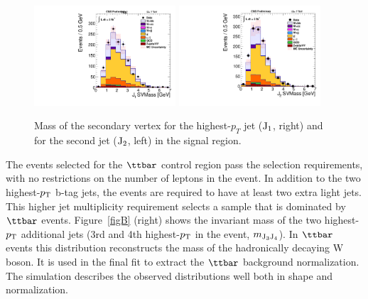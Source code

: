 \begin{figure}
\centering
\includegraphics[width=0.47\textwidth]{Wbb/fig1a_J1Mass.pdf}
\includegraphics[width=0.47\textwidth]{Wbb/fig1a_J2Mass.pdf}
\caption{Mass of the secondary vertex for the highest-$p_{T}$ jet ($\rm{J_{1}}$, right) and for the second jet ($\rm{J_{2}}$, left) in the signal region.}
\label{figAbis}
\end{figure}

The events selected for the $\ttbar$ control region pass the selection requirements, with
no restrictions on the number of leptons in the event. 
In addition to the two highest-$p_\mathrm{T}$ b-tag jets, the events are required to have at least two extra light jets.
This higher jet multiplicity requirement selects a sample that is dominated by $\ttbar$ events.
Figure~\ref{figB} (right) shows the invariant mass of the 
two highest-$p_\mathrm{T}$ additional jets (3rd and 4th highest-$p_\mathrm{T}$ in the event, $m_{\rm{J_{3}J_{4}}}$). 
In $\ttbar$ events this distribution reconstructs the mass of the hadronically decaying W boson. 
It is used in the final fit to extract the $\ttbar$ background normalization.
The simulation describes the observed distributions well both in 
shape and normalization.


